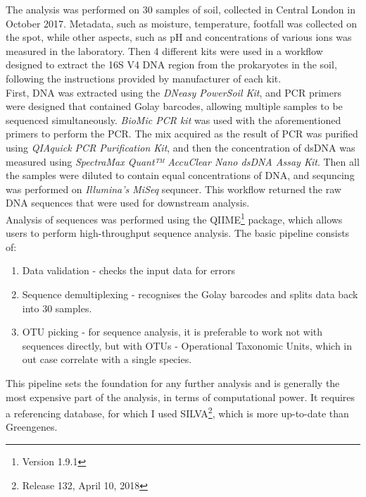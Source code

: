 \documentclass{article}
\begin{document}
\begin{multicols}{2}
The analysis was performed on 30 samples of soil, collected in Central London in October 2017. Metadata, such as moisture, temperature, footfall was collected on the spot, while other aspects, such as pH and concentrations of various ions was measured in the laboratory. Then 4 different kits were used in a workflow designed to extract the 16S V4 DNA region from the prokaryotes in the soil, following the instructions provided by manufacturer of each kit. \\
%
First, DNA was extracted using the \textit{DNeasy PowerSoil Kit}, and PCR primers were designed that contained Golay barcodes, allowing multiple samples to be sequenced simultaneously. \textit{BioMic PCR kit} was used with the aforementioned primers to perform the PCR. The mix acquired as the result of PCR was purified using \textit{QIAquick PCR Purification Kit}, and then the concentration of dsDNA was measured using \textit{SpectraMax Quant™ AccuClear Nano dsDNA Assay Kit}. Then all the samples were diluted to contain equal concentrations of DNA, and sequncing was performed on \textit{Illumina's MiSeq} sequncer. This workflow returned the raw DNA sequences that were used for downstream analysis.\\
%
Analysis of sequences was performed using the QIIME\footnote{Version 1.9.1} package\cite{Caporaso2010,Kuczynski2012}, which allows users to perform high-throughput sequence analysis. The basic pipeline consists of:
\begin{enumerate}
	\item Data validation - checks the input data for errors
	\item Sequence demultiplexing - recognises the Golay barcodes and splits data back into 30 samples.
	\item OTU picking - for sequence analysis, it is preferable to work not with sequences directly, but with OTUs - Operational Taxonomic Units, which in out case correlate with a single species.
\end{enumerate}
%
This pipeline sets the foundation for any further analysis and is generally the most expensive part of the analysis, in terms of computational power. It requires a referencing database, for which I used SILVA\cite{Quast2012}\footnote{Release 132, April 10, 2018}, which is more up-to-date than Greengenes\cite{McDonald2012}.\\


\end{multicols}
\end{document}
